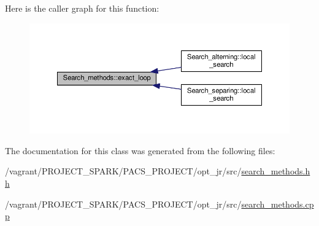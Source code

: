Here is the caller graph for this function\-:\nopagebreak
\begin{figure}[H]
\begin{center}
\leavevmode
\includegraphics[width=350pt]{classSearch__methods_a602ea0f40834d2ea817dc5fcab83436b_icgraph}
\end{center}
\end{figure}




The documentation for this class was generated from the following files\-:\begin{DoxyCompactItemize}
\item 
/vagrant/\-P\-R\-O\-J\-E\-C\-T\-\_\-\-S\-P\-A\-R\-K/\-P\-A\-C\-S\-\_\-\-P\-R\-O\-J\-E\-C\-T/opt\-\_\-jr/src/\hyperlink{search__methods_8hh}{search\-\_\-methods.\-hh}\item 
/vagrant/\-P\-R\-O\-J\-E\-C\-T\-\_\-\-S\-P\-A\-R\-K/\-P\-A\-C\-S\-\_\-\-P\-R\-O\-J\-E\-C\-T/opt\-\_\-jr/src/\hyperlink{search__methods_8cpp}{search\-\_\-methods.\-cpp}\end{DoxyCompactItemize}
